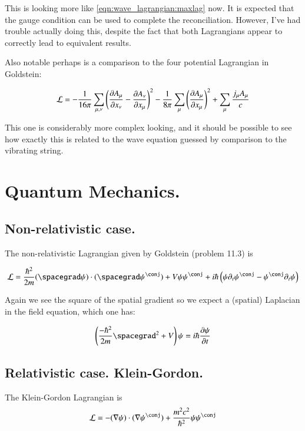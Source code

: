 This is looking more like \ref{eqn:wave_lagrangian:maxlag} now.  It is expected that the gauge condition can be used to complete the reconciliation.  However, I've had trouble actually doing this, despite the fact that both Lagrangians appear to correctly
lead to equivalent results.

Also notable perhaps is a comparison to the four potential Lagrangian in Goldstein:

\begin{align*}
\LL = 
-\inv{16\pi} \sum_{\mu,\nu} \left( 
\PD{x_\nu}{A_\mu} - \PD{x_\mu}{A_\nu} 
\right)^2
-\inv{8\pi} 
\sum_\mu
\left( 
\PD{x_\mu}{A_\mu}
\right)^2
+
\sum_\mu \frac{j_\mu A_\mu}{c}
\end{align*}

This one is considerably more complex looking, and 
it should be possible to see how exactly this is related to the wave
equation guessed by comparison to the vibrating string.

\section{Quantum Mechanics. }

\subsection{Non-relativistic case. }

The non-relativistic Lagrangian given by Goldstein (problem 11.3) is

\begin{align}
\LL = \frac{\hbar^2}{2m}
(\spacegrad \psi) \cdot (\spacegrad \psi^\conj) + V \psi \psi^\conj + {i \hbar} \left( \psi \partial_t \psi^\conj - \psi^\conj \partial_t \psi \right)
\end{align}

Again we see the square of the spatial gradient so we expect a (spatial) Laplacian
in the field equation, which one has:

\begin{align*}
\left( \frac{-\hbar^2}{2m} \spacegrad^2 + V \right) \psi = i \hbar \PD{t}{\psi}
\end{align*}

\subsection{Relativistic case. Klein-Gordon. }

The Klein-Gordon Lagrangian is
\begin{align*}
\LL 
&= -(\grad \psi) \cdot (\grad \psi^\conj) + \frac{m^2 c^2}{\hbar^2} \psi \psi^\conj \\
\end{align*}

